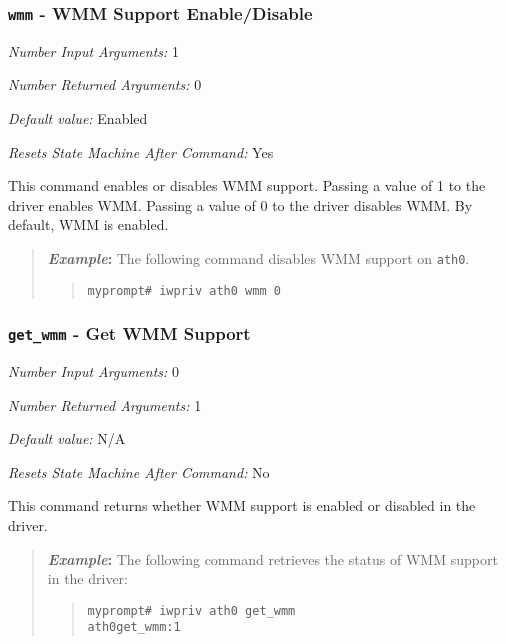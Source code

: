 \documentclass[10pt,fullpage]{article}
\newcommand{\mytt}[1]{{\texttt{#1}}}
\newcommand{\bv}{\begin{verse}}
\newcommand{\ev}{\end{verse}}
\newcommand{\cmd}[1]{{\texttt{myprompt\# #1}}}
\newcommand{\argdesc}[4]{\begin{description}
\itemsep -6pt
\item \textit{Number Input Arguments:} #1
\item \textit{Number Returned Arguments:} #2
\item \textit{Default value:} #3
\item \textit{Resets State Machine After Command:} #4
\end{description}
}
\newenvironment{example}{\begin{quote}\textbf{\textit{Example}:}}{\end{quote}}
\begin{document}
\subsubsection{\mytt{wmm} - WMM Support Enable/Disable}
\argdesc{1}{0}{Enabled}{Yes}
This command enables or disables WMM support. Passing a value of 1 to
the driver enables WMM. Passing a value of 0 to the driver disables
WMM.  By default, WMM is enabled.
\begin{example}
  The following command disables WMM support on \mytt{ath0}.
  \bv
  \cmd{iwpriv ath0 wmm 0}
  \ev
\end{example}

\subsubsection{\mytt{get\_wmm} - Get WMM Support}
\argdesc{0}{1}{N/A}{No}
This command returns whether WMM support is enabled or disabled in the
driver.
\begin{example}
  The following command retrieves the status of WMM support in the
  driver:
  \bv
  \cmd{iwpriv ath0 get\_wmm}\\
  \mytt{ath0\hspace{32pt}get\_wmm:1}
  \ev
\end{example}
\end{document}
